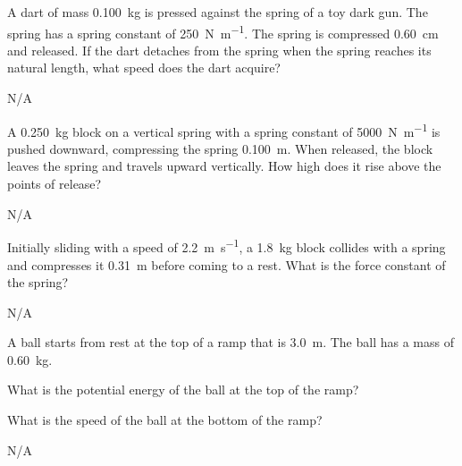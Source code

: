 \begin{question}[ID=energy-B-Q04,topic=energy,difficulty=B]
    A dart of mass \SI{0.100}{\kilo\gram} is pressed against the spring
        of a toy dark gun.
    The spring has a spring constant of \SI{250}{\newton\per\meter}.
    The spring is compressed \SI{0.60}{\centi\meter} and released.
    If the dart detaches from the spring when the spring reaches
        its natural length, what speed does the dart acquire?
\end{question}
\begin{solution}
    N/A
\end{solution}


\begin{question}[ID=energy-B-Q05,topic=energy,difficulty=B]
    A \SI{0.250}{\kilo\gram} block on a vertical spring with a
        spring constant of \SI{5000}{\newton\per\meter} is pushed
        downward, compressing the spring \SI{0.100}{\meter}.
    When released, the block leaves the spring and travels upward
        vertically.
    How high does it rise above the points of release?
\end{question}
\begin{solution}
    N/A
\end{solution}


\begin{question}[ID=energy-B-Q06,topic=energy,difficulty=B]
    Initially sliding with a speed of \SI{2.2}{\meter\per\second},
        a \SI{1.8}{\kilo\gram} block collides with a spring and
        compresses it \SI{0.31}{\meter} before coming to a rest.
    What is the force constant of the spring?
\end{question}
\begin{solution}
    N/A
\end{solution}


\begin{question}[ID=energy-C-Q01,topic=energy,difficulty=C]
    A ball starts from rest at the top of a ramp that
        is \SI{3.0}{\meter}.
    The ball has a mass of \SI{0.60}{\kilo\gram}.
    \begin{enumerate*}[label=\arabic*)]
        \item What is the potential energy of the ball at the top of the ramp?
        \item What is the speed of the ball at the bottom of the ramp?
    \end{enumerate*}
\end{question}
\begin{solution}
    N/A
\end{solution}


